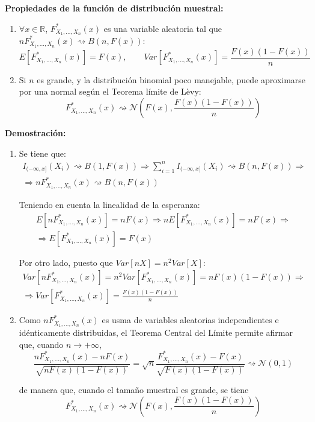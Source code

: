 \documentclass{article}
\begin{document}
\textbf{Propiedades de la función de distribución muestral:}
\begin{enumerate}
\item $\forall x\in\mathbb{R}$, $F_{X_1,\ldots,X_n}^*(x)$ es una variable aleatoria tal que $nF_{X_1,\ldots,X_n}^*(x)\rightsquigarrow B(n,F(x)):$
\begin{equation*}
E[F_{X_1,\ldots,X_n}^*(x)]=F(x),\qquad Var[F_{X_1,\ldots,X_n}^*(x)]=\frac{F(x)(1-F(x))}{n}
\end{equation*}

\item Si $n$ es grande, y la distribución binomial poco manejable, puede aproximarse por una normal según el Teorema límite de Lèvy:
\begin{equation*}
F_{X_1,\ldots,X_n}^*(x)\rightsquigarrow\mathcal{N}\left(F(x),\frac{F(x)(1-F(x))}{n}\right)
\end{equation*}
\end{enumerate}

\textbf{Demostración:}
\begin{enumerate}
\item Se tiene que:
\begin{gather*}
I_{(-\infty,x]}(X_i)\rightsquigarrow B(1,F(x))\Rightarrow \sum_{i=1}^n I_{(-\infty,x]}(X_i)\rightsquigarrow B(n,F(x))\Rightarrow\\
\Rightarrow nF_{X_1,\ldots,X_n}^*(x)\rightsquigarrow B(n,F(x))
\end{gather*}

Teniendo en cuenta la linealidad de la esperanza:
\begin{gather*}
E[nF_{X_1,\ldots,X_n}^*(x)]=nF(x)\Rightarrow nE[F_{X_1,\ldots,X_n}^*(x)]=nF(x)\Rightarrow\\
\Rightarrow E[F_{X_1,\ldots,X_n}^*(x)]=F(x)
\end{gather*}

Por otro lado, puesto que $Var[nX]=n^2Var[X]$:
\begin{gather*}
Var[nF_{X_1,\ldots,X_n}^*(x)]=n^2Var[F_{X_1,\ldots,X_n}^*(x)]=nF(x)(1-F(x))\Rightarrow\\
\Rightarrow Var[F_{X_1,\ldots,X_n}^*(x)]=\frac{F(x)(1-F(x))}{n}
\end{gather*}

\item Como $nF_{X_1,\ldots,X_n}^*(x)$ es usma de variables aleatorias independientes e idénticamente distribuidas, el Teorema Central del Límite permite afirmar que, cuando $n\to +\infty$,
\begin{equation*}
\frac{nF_{X_1,\ldots,X_n}^*(x)-nF(x)}{\sqrt{nF(x)(1-F(x))}}=\sqrt{n}\frac{F_{X_1,\ldots,X_n}^*(x)-F(x)}{\sqrt{F(x)(1-F(x))}}\rightsquigarrow \mathcal{N}(0,1)
\end{equation*}

de manera que, cuando el tamaño muestral es grande, se tiene 
\begin{equation*}
F_{X_1,\ldots,X_n}^*(x)\rightsquigarrow \mathcal{N}\left(F(x),\frac{F(x)(1-F(x))}{n}\right)
\end{equation*}
\end{enumerate}
\end{document}
